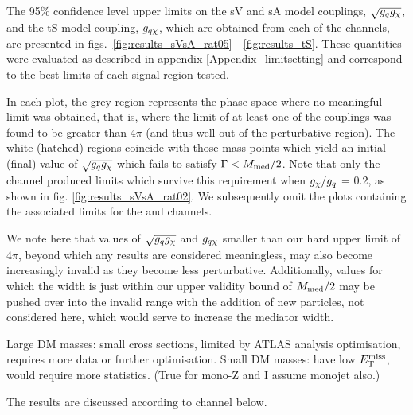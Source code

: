 The 95\% confidence level upper limits on the sV and sA model couplings, $\sqrt{g_q g_{\chi}}$, and the tS model coupling, $g_{q \chi}$, which are obtained from each of the \monoX channels, are presented in figs.~\ref{fig:results_sVsA_rat05} - \ref{fig:results_tS}. These quantities were evaluated as described in appendix \ref{Appendix_limitsetting} and correspond to the best limits of each signal region tested.

In each plot, the grey region represents the phase space where no meaningful limit was obtained, that is, where the limit of at least one of the couplings was found to be greater than $4\pi$ (and thus well out of the perturbative region). The white (hatched) regions coincide with those mass points which yield an initial (final) value of $\sqrt{g_q g_{\chi}}$ which fails to satisfy $\Gamma < M_{\mathrm{med}} / 2$. Note that only the \monojet channel produced limits which survive this requirement when $g_{\chi} / g_q$ = 0.2, as shown in fig. \ref{fig:results_sVsA_rat02}. We subsequently omit the plots containing the associated limits for the \monoZ and \monoWZ channels.

We note here that values of $\sqrt{g_q g_{\chi}}$ and $g_{q \chi}$ smaller than our hard upper limit of 4$\pi$, beyond which any results are considered meaningless, may also become increasingly invalid as they become less perturbative. Additionally, values for which the width is just within our upper validity bound of $M_{\mathrm{med}}/2$ may be pushed over into the invalid range with the addition of new particles, not considered here, which would serve to increase the mediator width.

Large DM masses: small cross sections, limited by ATLAS analysis optimisation, requires more data or further optimisation. Small DM masses: have low $E_{\mathrm{T}}^{\mathrm{miss}}$, would require more statistics. (True for mono-Z and I assume monojet also.)

The results are discussed according to channel below.

